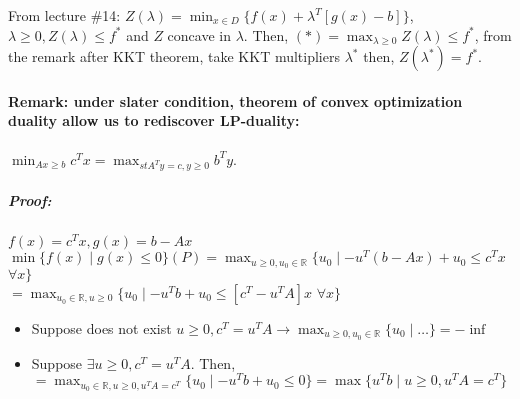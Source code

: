 \documentclass[main]{subfiles}
\begin{document}
From lecture \#14: $Z(\lambda) = \min_{x \in D} \{f(x) + \lambda^{T}[g(x) -b]
\}$, $\lambda \geq 0, Z(\lambda) \leq f^{*}$ and $Z$ concave in $\lambda$.
Then, $(*) = \max_{\lambda \geq 0} Z(\lambda) \leq f^{*}$, from the remark
after KKT theorem, take KKT multipliers $\lambda^{*}$ then, $Z(\lambda^{*}) =
f^{*}$.

\paragraph{Remark: under slater condition, theorem of convex optimization 
duality allow us to rediscover LP-duality:}
$\displaystyle \min_{Ax \geq b} c^{T}x = \max_{st A^{T}y = c, y \geq 0}
b^{T}y$.

\subparagraph{Proof:}
$f(x) = c^{T}x, g(x) = b - Ax$\\
$\displaystyle \min \{f(x) \mid g(x) \leq 0 \} (P) = \max_{u \geq 0, u_{0} \in
\mathbb{R}} \{ u_{0} \mid -u^{T}(b-Ax) + u_{0} \leq c^{T}x$ $ \forall x \}$\\
$ = \displaystyle \max_{u_{0} \in \mathbb{R}, u \geq 0} \{ u_{0} \mid -u^{T}b +
u_{0} \leq [c^{T} - u^{T}A]x$ $\forall x \}$
\begin{itemize}
\item Suppose does not exist $u \geq 0, c^{T} = u^{T}A \rightarrow \max_{u \geq
0, u_{0} \in \mathbb{R}} \{ u_{0} \mid \dots \} = - \inf$
\item Suppose $\exists u \geq 0, c^{T} = u^{T}A$. Then, $ = \displaystyle
\max_{u_{0} \in \mathbb{R}, u \geq 0, u^{T}A = c^{T}} \{u_{0} \mid -u^{T}b +
u_{0} \leq 0 \} = \max \{ u^{T}b \mid u \geq 0, u^{T}A = c^{T} \}$
\end{itemize}
\end{document}
